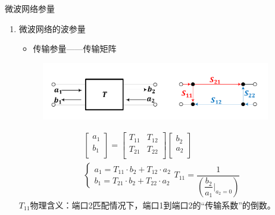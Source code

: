 \begin{frame}{微波网络参量}
    \begin{enumerate}
        \resume
        \item 微波网络的波参量\\
        \begin{itemize}
            \item 传输参量——传输矩阵
        \end{itemize}
        \begin{figure}
            \includegraphics[width=10cm]{Cha5//fig5-12.pdf}
        \end{figure}
        \begin{gather*}
            \begin{bmatrix*}
                a_1 \\
                b_1 \\
            \end{bmatrix*}=
            \begin{bmatrix*}
                T_{11} & T_{12} \\
                T_{21} & T_{22} \\
            \end{bmatrix*}
            \begin{bmatrix*}
                b_2 \\
                a_2 \\
            \end{bmatrix*}\\
            \begin{cases}
                a_1 = T_{11}\cdot b_2 + T_{12}\cdot a_2 \\
                b_1 = T_{21}\cdot b_2 + T_{22}\cdot a_2
            \end{cases}
            T_{11} = \dfrac{1}{\left(\dfrac{b_2}{a_1}\bigg|_{a_2=0}\right)}
        \end{gather*}
        $T_{11}$物理含义：端口2匹配情况下，端口1到端口2的“传输系数”的倒数。
    \end{enumerate}
\end{frame}

